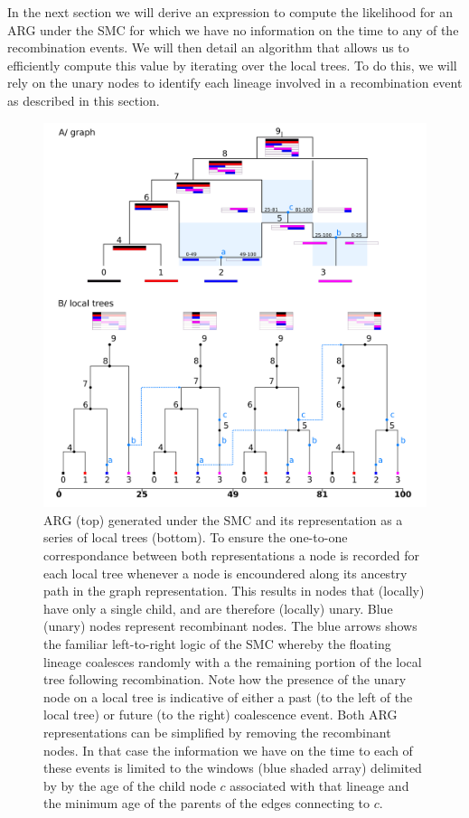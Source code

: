 \documentclass{article}
\begin{document}
In the next section we will derive an expression to compute the
likelihood for an ARG under the SMC for which we have no information on the
time to any of the recombination events. We will then detail an algorithm
that allows us to efficiently compute this value by iterating over the local trees.
To do this, we will rely on the unary nodes
to identify each lineage involved in a recombination event
as described in this section.


\begin{figure}[!ht]
\centering
\includegraphics[width=\textwidth]{figures/smc_custom_2rows_area_full_hap.png}
\caption{ARG (top) generated under the SMC and its representation as a
series of local trees (bottom). To ensure the one-to-one correspondance
between both representations a node is recorded for each local tree whenever
a node is encoundered along its ancestry path in the graph representation.
This results in nodes that (locally) have only a single child, and are therefore
(locally) unary. Blue (unary) nodes represent recombinant nodes.
The blue arrows shows the familiar left-to-right logic of the SMC whereby
the floating lineage coalesces randomly
with a the remaining portion of the local tree following recombination.
Note how the presence of the unary node on a local tree is
indicative of either a past (to the left of the local tree)
or future (to the right) coalescence event.
Both ARG representations can be simplified by removing the recombinant nodes.
In that case the information we have on the time to each of these events is
limited to the windows (blue shaded array) delimited by by the age of
the child node $c$ associated with that lineage and the minimum age of
the parents of the edges connecting to $c$.
}
\label{fig:smc-unary}
\end{figure}
\end{document}
